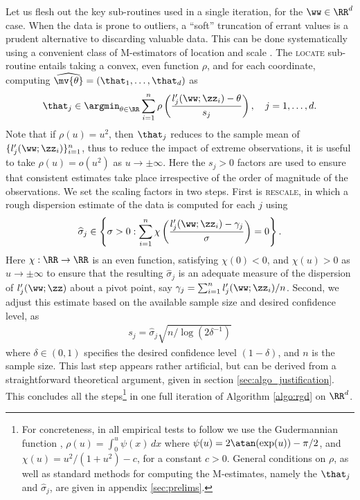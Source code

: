 \documentclass[11pt,oneside]{article}
\theoremstyle{definition} \newtheorem{defn}{Definition}       %
\theoremstyle{plain} \newtheorem{prop}[defn]{Proposition}           %
\theoremstyle{plain} \newtheorem{thm}[defn]{Theorem}                %
\theoremstyle{plain} \newtheorem{lem}[defn]{Lemma}                  %
\theoremstyle{plain} \newtheorem{cor}[defn]{Corollary}              %
\theoremstyle{remark} \newtheorem{rmk}[defn]{Remark}                %
\theoremstyle{remark} \newtheorem{ex}[defn]{Example}                %
\begin{document}
Let us flesh out the key sub-routines used in a single iteration, for the $\ww \in \RR^{d}$ case. When the data is prone to outliers, a ``soft'' truncation of errant values is a prudent alternative to discarding valuable data. This can be done systematically using a convenient class of M-estimators of location and scale \citep{vandervaart1998AS,huber2009a}. The \textsc{locate} sub-routine entails taking a convex, even function $\rho$, and for each coordinate, computing $\widehat{\mv{\theta}} = (\that_{1},\ldots,\that_{d})$ as
%
\begin{align}\label{eqn:location_rough}
\that_{j} \in \argmin_{\theta \in \RR} \sum_{i=1}^{n} \rho\left( \frac{l^{\prime}_{j}(\ww;\zz_{i})-\theta}{s_{j}} \right), \quad j = 1,\ldots,d.
\end{align}
%
Note that if $\rho(u) = u^{2}$, then $\that_{j}$ reduces to the sample mean of $\{l^{\prime}_{j}(\ww;\zz_{i})\}_{i=1}^{n}$, thus to reduce the impact of extreme observations, it is useful to take $\rho(u)=o(u^{2})$ as $u \to \pm\infty$. Here the $s_{j}>0$ factors are used to ensure that consistent estimates take place irrespective of the order of magnitude of the observations. We set the scaling factors in two steps. First is \textsc{rescale}, in which a rough dispersion estimate of the data is computed for each $j$ using
%
\begin{align}\label{eqn:dispersion_rough}
\widehat{\sigma}_{j} \in \left\{
\sigma > 0: \sum_{i=1}^{n} \chi\left(\frac{l^{\prime}_{j}(\ww;\zz_{i})-\gamma_{j}}{\sigma}\right) = 0 \right\}.
\end{align}
%
Here $\chi:\RR \to \RR$ is an even function, satisfying $\chi(0)<0$, and $\chi(u)>0$ as $u \to \pm\infty$ to ensure that the resulting $\widehat{\sigma}_{j}$ is an adequate measure of the dispersion of $l^{\prime}_{j}(\ww;\zz)$ about a pivot point, say $\gamma_{j}=\sum_{i=1}^{n}l^{\prime}_{j}(\ww;\zz_{i})/n$. Second, we adjust this estimate based on the available sample size and desired confidence level, as
%
\begin{align}\label{eqn:scale_rough}
s_{j} = \widehat{\sigma}_{j}\sqrt{n/\log(2\delta^{-1})}
\end{align}
%
where $\delta \in (0,1)$ specifies the desired confidence level $(1-\delta)$, and $n$ is the sample size. This last step appears rather artificial, but can be derived from a straightforward theoretical argument, given in section \ref{sec:algo_justification}. This concludes all the steps\footnote{For concreteness, in all empirical tests to follow we use the Gudermannian function \citep{abramowitz1964a}, $\rho(u) = \int_{0}^{u} \psi(x) \, dx$ where $\psi(u) = 2\atan(\exp(u))-\pi/2$, and $\chi(u) = u^{2}/(1+u^{2})-c$, for a constant $c>0$. General conditions on $\rho$, as well as standard methods for computing the M-estimates, namely the $\that_{j}$ and $\widehat{\sigma}_{j}$, are given in appendix \ref{sec:prelims}.} in one full iteration of Algorithm \ref{algo:rgd} on $\RR^{d}$.
\end{document}
